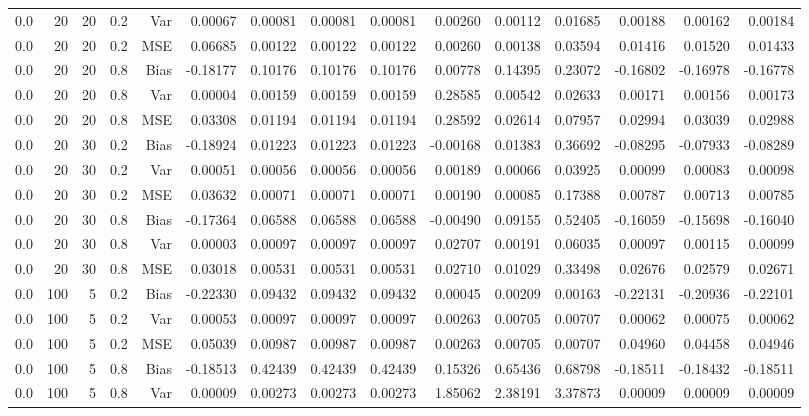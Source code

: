 \begin{table}[!htbp]
\begin{tabular}{lrrrrrrrrrrrrrr}
0.0 &  20 & 20 & 0.2 & Var & 0.00067 & 0.00081 & 0.00081 & 0.00081 & 0.00260 & 0.00112 & 0.01685 & 0.00188 & 0.00162 & 0.00184 \\
0.0 &  20 & 20 & 0.2 & MSE & 0.06685 & 0.00122 & 0.00122 & 0.00122 & 0.00260 & 0.00138 & 0.03594 & 0.01416 & 0.01520 & 0.01433 \\
0.0 &  20 & 20 & 0.8 & Bias & -0.18177 & 0.10176 & 0.10176 & 0.10176 & 0.00778 & 0.14395 & 0.23072 & -0.16802 & -0.16978 & -0.16778 \\
0.0 &  20 & 20 & 0.8 & Var & 0.00004 & 0.00159 & 0.00159 & 0.00159 & 0.28585 & 0.00542 & 0.02633 & 0.00171 & 0.00156 & 0.00173 \\
0.0 &  20 & 20 & 0.8 & MSE & 0.03308 & 0.01194 & 0.01194 & 0.01194 & 0.28592 & 0.02614 & 0.07957 & 0.02994 & 0.03039 & 0.02988 \\
0.0 &  20 & 30 & 0.2 & Bias & -0.18924 & 0.01223 & 0.01223 & 0.01223 & -0.00168 & 0.01383 & 0.36692 & -0.08295 & -0.07933 & -0.08289 \\
0.0 &  20 & 30 & 0.2 & Var & 0.00051 & 0.00056 & 0.00056 & 0.00056 & 0.00189 & 0.00066 & 0.03925 & 0.00099 & 0.00083 & 0.00098 \\
0.0 &  20 & 30 & 0.2 & MSE & 0.03632 & 0.00071 & 0.00071 & 0.00071 & 0.00190 & 0.00085 & 0.17388 & 0.00787 & 0.00713 & 0.00785 \\
0.0 &  20 & 30 & 0.8 & Bias & -0.17364 & 0.06588 & 0.06588 & 0.06588 & -0.00490 & 0.09155 & 0.52405 & -0.16059 & -0.15698 & -0.16040 \\
0.0 &  20 & 30 & 0.8 & Var & 0.00003 & 0.00097 & 0.00097 & 0.00097 & 0.02707 & 0.00191 & 0.06035 & 0.00097 & 0.00115 & 0.00099 \\
0.0 &  20 & 30 & 0.8 & MSE & 0.03018 & 0.00531 & 0.00531 & 0.00531 & 0.02710 & 0.01029 & 0.33498 & 0.02676 & 0.02579 & 0.02671 \\
0.0 & 100 &  5 & 0.2 & Bias & -0.22330 & 0.09432 & 0.09432 & 0.09432 & 0.00045 & 0.00209 & 0.00163 & -0.22131 & -0.20936 & -0.22101 \\
0.0 & 100 &  5 & 0.2 & Var & 0.00053 & 0.00097 & 0.00097 & 0.00097 & 0.00263 & 0.00705 & 0.00707 & 0.00062 & 0.00075 & 0.00062 \\
0.0 & 100 &  5 & 0.2 & MSE & 0.05039 & 0.00987 & 0.00987 & 0.00987 & 0.00263 & 0.00705 & 0.00707 & 0.04960 & 0.04458 & 0.04946 \\
0.0 & 100 &  5 & 0.8 & Bias & -0.18513 & 0.42439 & 0.42439 & 0.42439 & 0.15326 & 0.65436 & 0.68798 & -0.18511 & -0.18432 & -0.18511 \\
0.0 & 100 &  5 & 0.8 & Var & 0.00009 & 0.00273 & 0.00273 & 0.00273 & 1.85062 & 2.38191 & 3.37873 & 0.00009 & 0.00009 & 0.00009 \\

\end{tabular}
\end{table}
